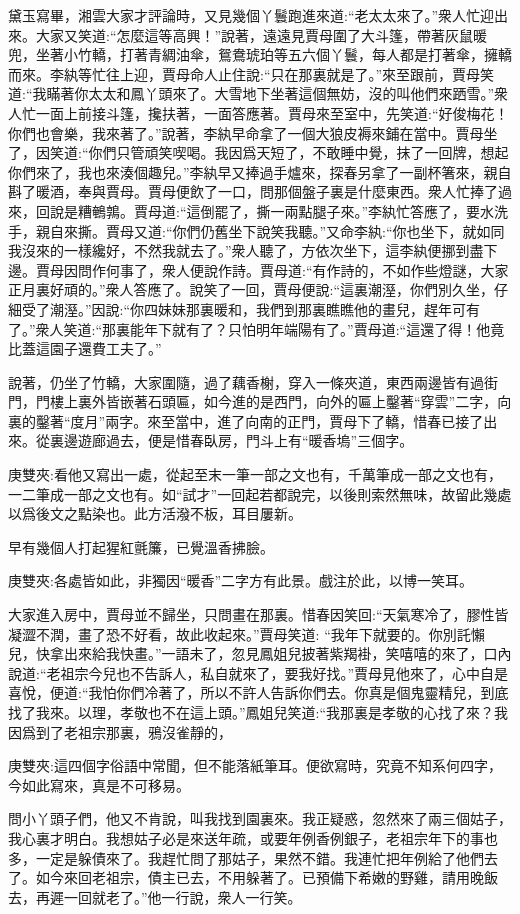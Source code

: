 \begin{parag}
    黛玉寫畢，湘雲大家才評論時，又見幾個丫鬟跑進來道:“老太太來了。”衆人忙迎出來。大家又笑道:“怎麼這等高興！”說著，遠遠見賈母圍了大斗篷，帶著灰鼠暖兜，坐著小竹轎，打著青綢油傘，鴛鴦琥珀等五六個丫鬟，每人都是打著傘，擁轎而來。李紈等忙往上迎，賈母命人止住說:“只在那裏就是了。”來至跟前，賈母笑道:“我瞞著你太太和鳳丫頭來了。大雪地下坐著這個無妨，沒的叫他們來跴雪。”衆人忙一面上前接斗篷，攙扶著，一面答應著。賈母來至室中，先笑道:“好俊梅花！你們也會樂，我來著了。”說著，李紈早命拿了一個大狼皮褥來鋪在當中。賈母坐了，因笑道:“你們只管頑笑喫喝。我因爲天短了，不敢睡中覺，抹了一回牌，想起你們來了，我也來湊個趣兒。”李紈早又捧過手爐來，探春另拿了一副杯箸來，親自斟了暖酒，奉與賈母。賈母便飲了一口，問那個盤子裏是什麼東西。衆人忙捧了過來，回說是糟鵪鶉。賈母道:“這倒罷了，撕一兩點腿子來。”李紈忙答應了，要水洗手，親自來撕。賈母又道:“你們仍舊坐下說笑我聽。”又命李紈:“你也坐下，就如同我沒來的一樣纔好，不然我就去了。”衆人聽了，方依次坐下，這李紈便挪到盡下邊。賈母因問作何事了，衆人便說作詩。賈母道:“有作詩的，不如作些燈謎，大家正月裏好頑的。”衆人答應了。說笑了一回，賈母便說:“這裏潮溼，你們別久坐，仔細受了潮溼。”因說:“你四妹妹那裏暖和，我們到那裏瞧瞧他的畫兒，趕年可有了。”衆人笑道:“那裏能年下就有了？只怕明年端陽有了。”賈母道:“這還了得！他竟比蓋這園子還費工夫了。”
\end{parag}


\begin{parag}
    說著，仍坐了竹轎，大家圍隨，過了藕香榭，穿入一條夾道，東西兩邊皆有過街門，門樓上裏外皆嵌著石頭匾，如今進的是西門，向外的匾上鑿著“穿雲”二字，向裏的鑿著“度月”兩字。來至當中，進了向南的正門，賈母下了轎，惜春已接了出來。從裏邊遊廊過去，便是惜春臥房，門斗上有“暖香塢”三個字。\begin{note}庚雙夾:看他又寫出一處，從起至末一筆一部之文也有，千萬筆成一部之文也有，一二筆成一部之文也有。如“試才”一回起若都說完，以後則索然無味，故留此幾處以爲後文之點染也。此方活潑不板，耳目屢新。\end{note}早有幾個人打起猩紅氈簾，已覺溫香拂臉。\begin{note}庚雙夾:各處皆如此，非獨因“暖香”二字方有此景。戲注於此，以博一笑耳。\end{note}大家進入房中，賈母並不歸坐，只問畫在那裏。惜春因笑回:“天氣寒冷了，膠性皆凝澀不潤，畫了恐不好看，故此收起來。”賈母笑道: “我年下就要的。你別託懶兒，快拿出來給我快畫。”一語未了，忽見鳳姐兒披著紫羯褂，笑嘻嘻的來了，口內說道:“老祖宗今兒也不告訴人，私自就來了，要我好找。”賈母見他來了，心中自是喜悅，便道:“我怕你們冷著了，所以不許人告訴你們去。你真是個鬼靈精兒，到底找了我來。以理，孝敬也不在這上頭。”鳳姐兒笑道:“我那裏是孝敬的心找了來？我因爲到了老祖宗那裏，鴉沒雀靜的，\begin{note}庚雙夾:這四個字俗語中常聞，但不能落紙筆耳。便欲寫時，究竟不知系何四字，今如此寫來，真是不可移易。\end{note}問小丫頭子們，他又不肯說，叫我找到園裏來。我正疑惑，忽然來了兩三個姑子，我心裏才明白。我想姑子必是來送年疏，或要年例香例銀子，老祖宗年下的事也多，一定是躲債來了。我趕忙問了那姑子，果然不錯。我連忙把年例給了他們去了。如今來回老祖宗，債主已去，不用躲著了。已預備下希嫩的野雞，請用晚飯去，再遲一回就老了。”他一行說，衆人一行笑。
\end{parag}


